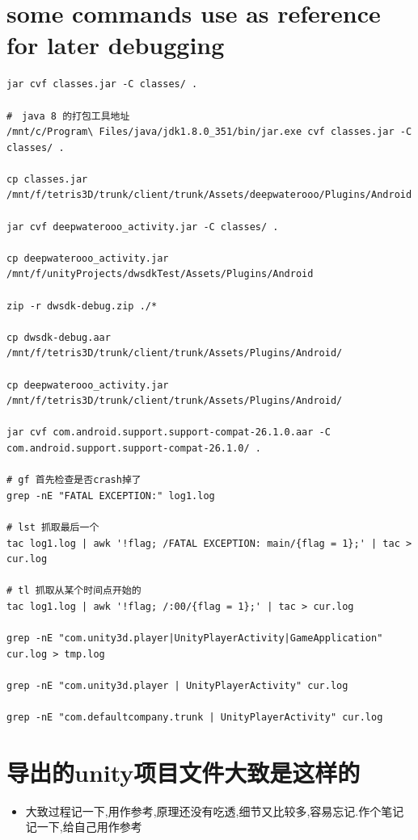 \documentclass[9pt, b5paper]{article}
\begin{document}
\section{some commands use as reference for later debugging}
\label{sec-3}
\begin{verbatim}
jar cvf classes.jar -C classes/ .

#　java 8 的打包工具地址
/mnt/c/Program\ Files/java/jdk1.8.0_351/bin/jar.exe cvf classes.jar -C classes/ . 

cp classes.jar /mnt/f/tetris3D/trunk/client/trunk/Assets/deepwaterooo/Plugins/Android 

jar cvf deepwaterooo_activity.jar -C classes/ .       

cp deepwaterooo_activity.jar /mnt/f/unityProjects/dwsdkTest/Assets/Plugins/Android 

zip -r dwsdk-debug.zip ./*

cp dwsdk-debug.aar /mnt/f/tetris3D/trunk/client/trunk/Assets/Plugins/Android/

cp deepwaterooo_activity.jar /mnt/f/tetris3D/trunk/client/trunk/Assets/Plugins/Android/

jar cvf com.android.support.support-compat-26.1.0.aar -C com.android.support.support-compat-26.1.0/ .

# gf 首先检查是否crash掉了 
grep -nE "FATAL EXCEPTION:" log1.log

# lst 抓取最后一个
tac log1.log | awk '!flag; /FATAL EXCEPTION: main/{flag = 1};' | tac > cur.log

# tl 抓取从某个时间点开始的
tac log1.log | awk '!flag; /:00/{flag = 1};' | tac > cur.log

grep -nE "com.unity3d.player|UnityPlayerActivity|GameApplication" cur.log > tmp.log

grep -nE "com.unity3d.player | UnityPlayerActivity" cur.log

grep -nE "com.defaultcompany.trunk | UnityPlayerActivity" cur.log
\end{verbatim}

\section{导出的unity项目文件大致是这样的}
\label{sec-4}
\begin{itemize}
\item 大致过程记一下,用作参考,原理还没有吃透,细节又比较多,容易忘记.作个笔记记一下,给自己用作参考
\end{itemize}
\end{document}
